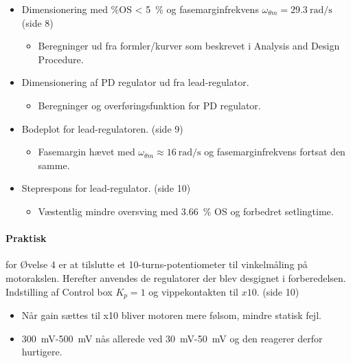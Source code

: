 \documentclass[danish]{article}
\begin{document}
\begin{itemize}
	\item Dimensionering med $\si{\percent}$OS < \SI{5}{\percent} og fasemarginfrekvens $\omega_{\theta m} = \SI{29,3}{\radian\per\second}$ (side 8)
	\begin{itemize}
		\item Beregninger ud fra formler/kurver som beskrevet i Analysis and Design Procedure.
	\end{itemize}
	\item Dimensionering af PD regulator ud fra lead-regulator.
	\begin{itemize}
		\item Beregninger og overføringsfunktion for PD regulator.
	\end{itemize}
	\item Bodeplot for lead-regulatoren. (side 9)
	\begin{itemize}
		\item Fasemargin hævet med $\omega_{\theta m} \approx \SI{16}{\radian\per\second}$ og fasemarginfrekvens fortsat den samme.
	\end{itemize}
	\item Steprespons for lead-regulator. (side 10)
	\begin{itemize}
		\item Væstentlig mindre oversving med \SI{3,66}{\percent} OS og forbedret setlingtime.
	\end{itemize}
\end{itemize}

\paragraph{Praktisk} for Øvelse 4 er at tilslutte et 10-turns-potentiometer til vinkelmåling på motorakslen. Herefter anvendes de regulatorer der blev desgignet i forberedelsen.\\


Indstilling af Control box $K_p=1$ og vippekontakten til $x10$. (side 10)
\begin{itemize}
	\item Når gain sættes til x10 bliver motoren mere følsom, mindre statisk fejl.
	\item \SI{300}{\milli\volt}-\SI{500}{\milli\volt} nås allerede ved \SI{30}{\milli\volt}-\SI{50}{\milli\volt} og den reagerer derfor hurtigere.
\end{itemize}
\end{document}
